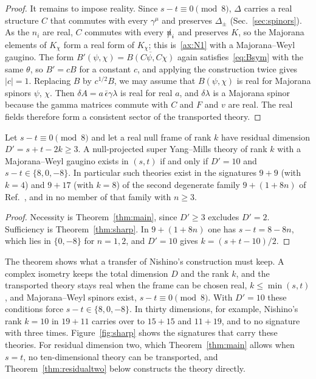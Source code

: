 \begin{proof}
It remains to impose reality. Since $s-t\equiv0\pmod8$, $\Delta$ carries a real structure $C$ that commutes with every $\gamma^\mu$ and preserves $\Delta_\pm$ (Sec.~\ref{sec:spinors}). As the $n_i$ are real, $C$ commutes with every $\slashed{n}_i$ and preserves $K$, so the Majorana elements of $K_\chi$ form a real form of $K_\chi$; this is~\ref{ax:N1} with a Majorana--Weyl gaugino. The form $B'(\psi,\chi)=\overline{B(C\psi,C\chi)}$ again satisfies~\eqref{eq:Bsym} with the same $\theta$, so $B'=cB$ for a constant $c$, and applying the construction twice gives $|c|=1$. Replacing $B$ by $c^{1/2}B$, we may assume that $B(\psi,\chi)$ is real for Majorana spinors $\psi$, $\chi$. Then $\delta A=a\,\bar\epsilon\gamma\lambda$ is real for real $a$, and $\delta\lambda$ is a Majorana spinor because the gamma matrices commute with $C$ and $F$ and $v$ are real. The real fields therefore form a consistent sector of the transported theory.
\end{proof}

\begin{corollary}
\label{cor:classification}
Let $s-t\equiv0\pmod8$ and let a real null frame of rank $k$ have residual dimension $D'=s+t-2k\ge3$. A null-projected super Yang--Mills theory of rank $k$ with a Majorana--Weyl gaugino exists in $(s,t)$ if and only if $D'=10$ and $s-t\in\{8,0,-8\}$. In particular such theories exist in the signatures $9+9$ (with $k=4$) and $9+17$ (with $k=8$) of the second degenerate family $9+(1+8n)$ of Ref.~\cite{RiosMarraniChester2019}, and in no member of that family with $n\ge3$.
\end{corollary}

\begin{proof}
Necessity is Theorem~\ref{thm:main}, since $D'\ge3$ excludes $D'=2$. Sufficiency is Theorem~\ref{thm:sharp}. In $9+(1+8n)$ one has $s-t=8-8n$, which lies in $\{0,-8\}$ for $n=1,2$, and $D'=10$ gives $k=(s+t-10)/2$.
\end{proof}

The theorem shows what a transfer of Nishino's construction must keep. A complex isometry keeps the total dimension $D$ and the rank $k$, and the transported theory stays real when the frame can be chosen real, $k\le\min(s,t)$, and Majorana--Weyl spinors exist, $s-t\equiv0\pmod 8$. With $D'=10$ these conditions force $s-t\in\{8,0,-8\}$. In thirty dimensions, for example, Nishino's rank $k=10$ in $19+11$ carries over to $15+15$ and $11+19$, and to no signature with three times. Figure~\ref{fig:sharp} shows the signatures that carry these theories. For residual dimension two, which Theorem~\ref{thm:main} allows when $s=t$, no ten-dimensional theory can be transported, and Theorem~\ref{thm:residualtwo} below constructs the theory directly.


